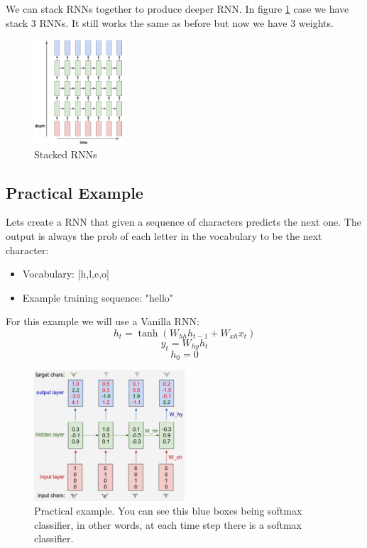 We can stack RNNs together to produce deeper RNN. In figure \ref{fig:RNN_toghether} case we have stack 3 RNNs. It still works the same as before but now we have 3 weights.
\begin{figure}[h]
  \centering
  \includegraphics[width=0.3\textwidth]{Images/recurrent_neural_networks/4.png}
  \caption{Stacked RNNs}
\end{figure}

\subsection*{Practical Example}

Lets create a RNN that given a sequence of characters predicts the next one. The output is always the prob of each letter in the vocabulary to be the next character:
\begin{itemize}
\item Vocabulary: [h,l,e,o]
\item Example training sequence: "hello"
\end{itemize}

For this example we will use a Vanilla RNN:
\begin{equation}
h_t = \tanh(W_{hh}h_{t-1}+W_{xh}x_t)
\end{equation}
\begin{equation}
y_t = W_{hy}h_{t}
\end{equation}
\begin{equation}
h_0 = 0
\end{equation}

\begin{figure}[h]
  \centering
  \includegraphics[width=0.5\textwidth]{Images/recurrent_neural_networks/10.png}
  \caption{Practical example. You can see this blue boxes being softmax classifier, in other words, at each time step there is a softmax classifier.}
  \label{fig:RNN_toghether}
\end{figure}


